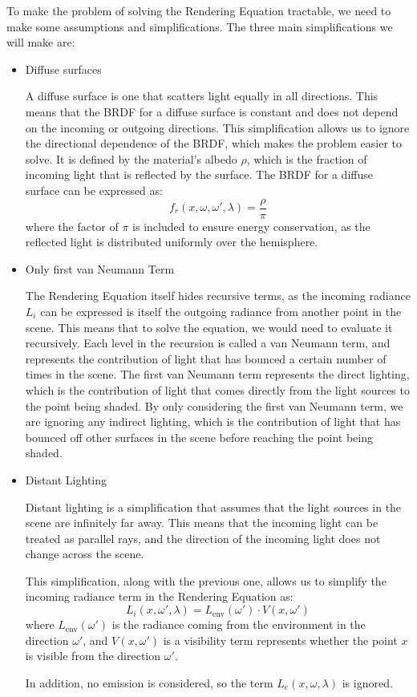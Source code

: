To make the problem of solving the Rendering Equation tractable, we need to make some assumptions and simplifications. The three main simplifications we will make are:
\begin{itemize}
    \item Diffuse surfaces
    
    A diffuse surface is one that scatters light equally in all directions. This means that the BRDF for a diffuse surface is constant and does not depend on the incoming or outgoing directions. This simplification allows us to ignore the directional dependence of the BRDF, which makes the problem easier to solve. It is defined by the material's albedo $\rho$, which is the fraction of incoming light that is reflected by the surface. The BRDF for a diffuse surface can be expressed as:
\begin{equation*}
    f_r(x, \omega, \omega', \lambda) = \frac{\rho}{\pi}
\end{equation*}
    where the factor of $\pi$ is included to ensure energy conservation, as the reflected light is distributed uniformly over the hemisphere.


    \item Only first van Neumann Term
    
    The Rendering Equation itself hides recursive terms, as the incoming radiance $L_i$ can be expressed is itself the outgoing radiance from another point in the scene. This means that to solve the equation, we would need to evaluate it recursively. Each level in the recursion is called a van Neumann term, and represents the contribution of light that has bounced a certain number of times in the scene. The first van Neumann term represents the direct lighting, which is the contribution of light that comes directly from the light sources to the point being shaded. By only considering the first van Neumann term, we are ignoring any indirect lighting, which is the contribution of light that has bounced off other surfaces in the scene before reaching the point being shaded.

    \item Distant Lighting
    
    Distant lighting is a simplification that assumes that the light sources in the scene are infinitely far away. This means that the incoming light can be treated as parallel rays, and the direction of the incoming light does not change across the scene.

    This simplification, along with the previous one, allows us to simplify the incoming radiance term in the Rendering Equation as:
\begin{equation*}
    L_i(x, \omega', \lambda) = L_{\text{env}}(\omega')\cdot V(x, \omega')
\end{equation*}
    where $L_{\text{env}}(\omega')$ is the radiance coming from the environment in the direction $\omega'$, and $V(x, \omega')$ is a visibility term represents whether the point $x$ is visible from the direction $\omega'$.

    In addition, no emission is considered, so the term $L_e(x, \omega, \lambda)$ is ignored.
\end{itemize}

